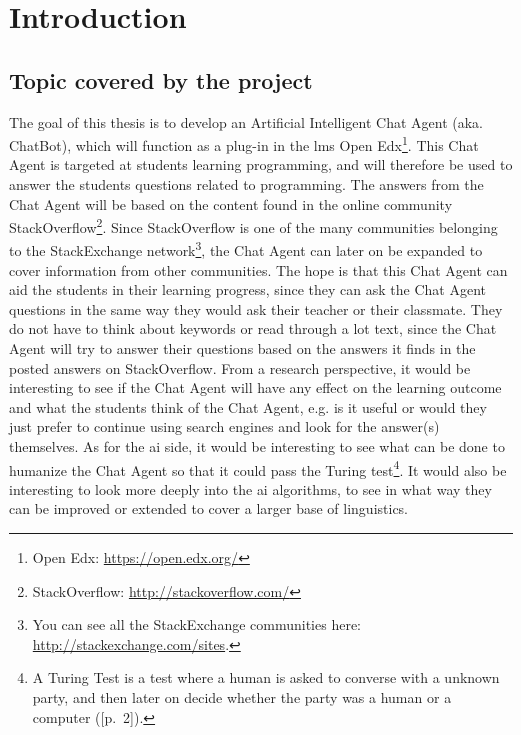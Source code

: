 \chapter{Introduction}
\label{chapter2:introduction}

\section{Topic covered by the project}
\label{chapter2:topic}
The goal of this thesis is to develop an Artificial Intelligent Chat Agent (aka. ChatBot), which will function as a plug-in in the \gls{lms} Open Edx\footnote{Open Edx: 
\url{https://open.edx.org/}}. This Chat Agent is targeted at students learning programming, and will therefore be used to answer the students questions related to programming. 
The answers from the Chat Agent will be based on the content found in the online community StackOverflow\footnote{StackOverflow: \url{http://stackoverflow.com/}}. 
Since StackOverflow is one of the many communities belonging to the StackExchange network\footnote{You can see all the StackExchange communities here: 
\url{http://stackexchange.com/sites}.}, the Chat Agent can later on be expanded to cover information from other communities.
\vspace{0.5em}\newline
The hope is that this Chat Agent can aid the students in their learning progress, since they can ask the Chat Agent questions in the same way they would ask their teacher or 
their classmate. They do not have to think about keywords or read through a lot text, since the Chat Agent will try to answer their questions based on the answers it finds 
in the posted answers on StackOverflow.
\vspace{0.5em}\newline
From a research perspective, it would be interesting to see if the Chat Agent will have any effect on the learning outcome and what the students think of the Chat Agent, e.g. is it 
useful or would they just prefer to continue using search engines and look for the answer(s) themselves. As for the \gls{ai} side, it would be interesting to see what can be done to
humanize the Chat Agent so that it could pass the Turing test\footnote{A Turing Test is a test where a human is asked to converse with a unknown party, and then later on decide
whether the party was a human or a computer ([p.~2]\cite{Russell2013}).}. It would also be interesting to look more deeply into the \gls{ai} algorithms, to see in what way they can 
be improved or extended to cover a larger base of linguistics.

